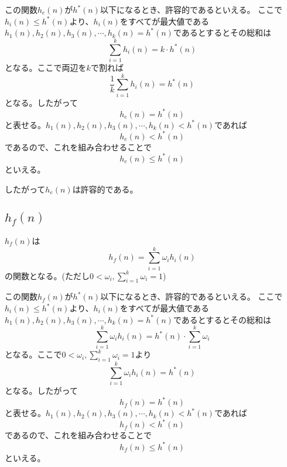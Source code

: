 \documentclass[a4paper,11pt,dvipdfmx]{jsarticle}
\begin{document}
この関数$h_e(n)$が$h^*(n)$以下になるとき、許容的であるといえる。
ここで$h_i(n) \leq h^*(n)$より、$h_i(n)$をすべてが最大値である$h_1(n),h_2(n),h_3(n),\cdots,h_k(n) = h^*(n)$であるとするとその総和は
\begin{equation*}
    \sum_{i=1}^{k}h_i(n) = k \cdot h^*(n)
\end{equation*}
となる。ここで両辺を$k$で割れば
\begin{equation*}
    \frac{1}{k}\sum_{i=1}^{k}h_i(n) = h^*(n)
\end{equation*}
となる。したがって
\begin{equation*}
    h_e(n) = h^*(n)
\end{equation*}
と表せる。$h_1(n),h_2(n),h_3(n),\cdots,h_k(n) < h^*(n)$であれば
\begin{equation*}
    h_e(n) < h^*(n)
\end{equation*}
であるので、これを組み合わせることで
\begin{equation*}
    h_e(n) \leq h^*(n)
\end{equation*}
といえる。

したがって$h_e(n)$は許容的である。

\subsection{$h_f(n)$}
$h_f(n)$は
\begin{equation*}
    h_f(n) = \sum_{i=1}^{k}\omega_i h_i(n)
\end{equation*}
の関数となる。(ただし$0<\omega_i,\sum_{i=1}^{k}\omega_i = 1$)

この関数$h_f(n)$が$h^*(n)$以下になるとき、許容的であるといえる。
ここで$h_i(n) \leq h^*(n)$より、$h_i(n)$をすべてが最大値である$h_1(n),h_2(n),h_3(n),\cdots,h_k(n) = h^*(n)$であるとするとその総和は
\begin{equation*}
    \sum_{i=1}^{k}\omega_ih_i(n) = h^*(n) \cdot \sum_{i=1}^{k}\omega_i
\end{equation*}
となる。ここで$0<\omega_i,\sum_{i=1}^{k}\omega_i = 1$より
\begin{equation*}
    \sum_{i=1}^{k}\omega_ih_i(n) = h^*(n)
\end{equation*}
となる。したがって
\begin{equation*}
    h_f(n) = h^*(n)
\end{equation*}
と表せる。$h_1(n),h_2(n),h_3(n),\cdots,h_k(n) < h^*(n)$であれば
\begin{equation*}
    h_f(n) < h^*(n)
\end{equation*}
であるので、これを組み合わせることで
\begin{equation*}
    h_f(n) \leq h^*(n)
\end{equation*}
といえる。
\end{document}
